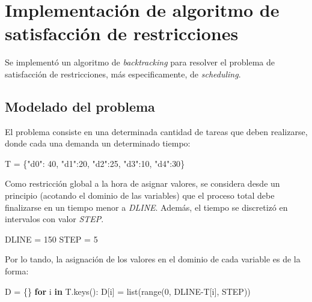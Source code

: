 \documentclass[
]{article}
\newenvironment{Shaded}{}{}
\newcommand{\BuiltInTok}[1]{#1}
\newcommand{\ControlFlowTok}[1]{\textcolor[rgb]{0.00,0.44,0.13}{\textbf{#1}}}
\newcommand{\DecValTok}[1]{\textcolor[rgb]{0.25,0.63,0.44}{#1}}
\newcommand{\KeywordTok}[1]{\textcolor[rgb]{0.00,0.44,0.13}{\textbf{#1}}}
\newcommand{\NormalTok}[1]{#1}
\newcommand{\OperatorTok}[1]{\textcolor[rgb]{0.40,0.40,0.40}{#1}}
\newcommand{\StringTok}[1]{\textcolor[rgb]{0.25,0.44,0.63}{#1}}
\begin{document}
\hypertarget{implementaciuxf3n-de-algoritmo-de-satisfacciuxf3n-de-restricciones}{%
\section{Implementación de algoritmo de satisfacción de
restricciones}\label{implementaciuxf3n-de-algoritmo-de-satisfacciuxf3n-de-restricciones}}

Se implementó un algoritmo de \emph{backtracking} para resolver el
problema de satisfacción de restricciones, más especificamente, de
\emph{scheduling}.

\hypertarget{modelado-del-problema-1}{%
\subsection{Modelado del problema}\label{modelado-del-problema-1}}

El problema consiste en una determinada cantidad de tareas que deben
realizarse, donde cada una demanda un determinado tiempo:

\begin{Shaded}
\begin{Highlighting}[]
\NormalTok{T }\OperatorTok{=}\NormalTok{ \{}\StringTok{"d0"}\NormalTok{: }\DecValTok{40}\NormalTok{, }\StringTok{"d1"}\NormalTok{:}\DecValTok{20}\NormalTok{, }\StringTok{"d2"}\NormalTok{:}\DecValTok{25}\NormalTok{, }\StringTok{"d3"}\NormalTok{:}\DecValTok{10}\NormalTok{, }\StringTok{"d4"}\NormalTok{:}\DecValTok{30}\NormalTok{\}}
\end{Highlighting}
\end{Shaded}

Como restricción global a la hora de asignar valores, se considera desde
un principio (acotando el dominio de las variables) que el proceso total
debe finalizarse en un tiempo menor a \emph{DLINE}. Además, el tiempo se
discretizó en intervalos con valor \emph{STEP}.

\begin{Shaded}
\begin{Highlighting}[]
\NormalTok{DLINE }\OperatorTok{=} \DecValTok{150}
\NormalTok{STEP }\OperatorTok{=} \DecValTok{5}
\end{Highlighting}
\end{Shaded}

Por lo tando, la asignación de los valores en el dominio de cada
variable es de la forma:

\begin{Shaded}
\begin{Highlighting}[]
\NormalTok{D }\OperatorTok{=}\NormalTok{ \{\}}
\ControlFlowTok{for}\NormalTok{ i }\KeywordTok{in}\NormalTok{ T.keys():}
\NormalTok{    D[i] }\OperatorTok{=} \BuiltInTok{list}\NormalTok{(}\BuiltInTok{range}\NormalTok{(}\DecValTok{0}\NormalTok{, DLINE}\OperatorTok{-}\NormalTok{T[i], STEP))}
\end{Highlighting}
\end{Shaded}
\end{document}
